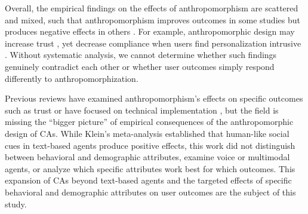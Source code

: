 \documentclass[manuscript,anonymous,sigconf]{acmart}
\begin{document}
Overall, the empirical findings on the effects of anthropomorphism are scattered and mixed, such that anthropomorphism improves outcomes in some studies \citep{go2019humanizing} but produces negative effects in others \citep{crolic2022blame}. For example, anthropomorphic design may increase trust \citep{go2019humanizing,konya2023anthropomorphism}, yet decrease compliance when users find personalization intrusive \citep{chen_you_2021}. Without systematic analysis, we cannot determine whether such findings genuinely contradict each other or whether user outcomes simply respond differently to anthropomorphization.

Previous reviews have examined anthropomorphism's effects on specific outcomes such as trust \citep{bach2024systematic} or have focused on technical implementation \cite{chen2024trends}, but the field is missing the ``bigger picture'' of empirical consequences of the anthropomorphic design of CAs. While Klein's \cite{klein_effects_2025} meta-analysis established that human-like social cues in text-based agents produce positive effects, this work did not distinguish between behavioral and demographic attributes, examine voice or multimodal agents, or analyze which specific attributes work best for which outcomes. This expansion of CAs beyond text-based agents and the targeted effects of specific behavioral and demographic attributes on user outcomes are the subject of this study.  %
\end{document}
